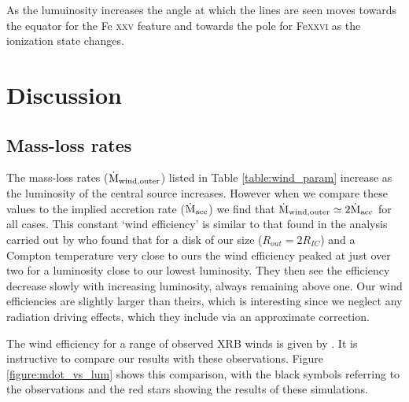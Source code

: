 \documentclass[a4paper,fleqn,usenatbib]{mnras}
\begin{document}
As the lumuinosity increases the angle at which the lines are seen moves towards the equator for the 
Fe \textsc{xxv} feature and towards the pole for Fe\textsc{xxvi} as the ionization state changes.





\section{Discussion}
\label{section:discussion}


\subsection{Mass-loss rates}

The mass-loss rates ($\dot{\rm{M}}_{\rm{wind,outer}}$) listed in Table \ref{table:wind_param}  
increase as the luminosity of the central source increases. However when we  compare these values to the implied
accretion rate ($\dot{\rm{M}}_{\rm{acc}}$) we find that $\dot{\rm{M}}_{\rm{wind,outer}}\simeq2\dot{\rm{M}}_{\rm{acc}}$
for all cases.
This constant `wind efficiency' is similar to that found in the analysis carried out by \cite{2018MNRAS.473..838D}
who found that for a disk of our size ($R_{out}=2R_{IC}$) and a Compton temperature
very close to ours the wind efficiency peaked at just over two for a luminosity close to our lowest luminosity.
They then see the efficiency decrease slowly with increasing luminosity, 
always remaining above one. Our wind efficiencies are slightly larger than theirs, which is interesting since
we neglect any radiation driving effects, which they include via an approximate correction. 

The wind efficiency for a range of observed XRB winds is given by \cite{2012MNRAS.422L..11P}.
It is instructive to compare our results with these observations. Figure \ref{figure:mdot_vs_lum} shows 
this comparison, with the black symbols referring to the observations and the red stars showing the
results of these simulations. 
\end{document}
